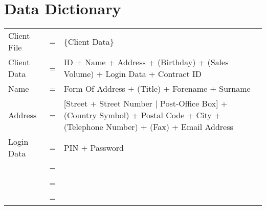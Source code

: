\documentclass[12pt,a4paper]{article}
\begin{document}

\section{Data Dictionary}

\begin{comment}

Required Data (top level)
------------------------
Client File
Order
Article

\end{comment}

\begin{tabular}{p{4cm}p{0.5cm}p{8cm}}
Client File & = & \{Client Data\} \\
Client Data & = & ID + Name + Address + (Birthday) + (Sales Volume) + Login Data + Contract ID\\
Name & = & Form Of Address + (Title) + Forename + Surname \\
Address & = & [Street + Street Number $|$ Post-Office Box] + (Country Symbol) +  Postal Code + City + (Telephone Number) + (Fax) + Email Address\\
Login Data & = & PIN + Password \\
& = &  \\
& = &  \\
& = &  \\
\end{tabular}
\end{document}
